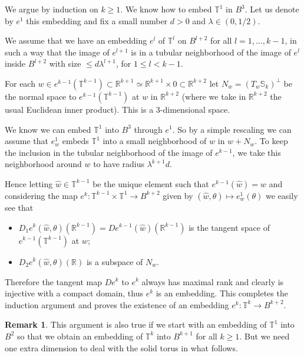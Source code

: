 \documentclass[reqno,12pt,a4paper]{amsart}
\theoremstyle{plain}
\theoremstyle{definition}
\newtheorem{remark}[theorem]{Remark}
\begin{document}
We argue by induction on $k\ge1$. We know how to embed
${{\mathbb T}}^1$ in $B^3$. Let us denote by $e^1$ this embedding
and fix a small number $d>0$ and $\lambda\in(0,1/2)$.

We assume that we have an embedding $e^{l}$ of ${{\mathbb T}}^{l}$ on
$B^{l+2}$ for all $l=1,\dots,k-1$, in such a way that the
image of $e^{l+1}$ is in a tubular neighborhood of the image
of $e^l$ inside $B^{l+2}$ with size $\le d\lambda^{l+1}$, for
$1\le l < k-1$.

For each $w\in e^{k-1}({{\mathbb T}}^{k-1})\subset {{\mathbb R}}^{k+1}\simeq
{{\mathbb R}}^{k+1}\times 0 \subset {{\mathbb R}}^{k+2}$ let
$N_w=(T_w{{\mathbb S}}_{k})^\perp$ be the normal space to
$e^{k-1}({{\mathbb T}}^{k-1})$ at $w$ in ${{\mathbb R}}^{k+2}$ (where we take in
${{\mathbb R}}^{k+2}$ the usual Euclidean inner product). This is a
$3$-dimensional space.

We know we can embed ${{\mathbb T}}^1$ into $B^3$ through
$e^1$. So by a simple rescaling we can assume that $e^1_w$
embeds ${{\mathbb T}}^{1}$ into a small neighborhood of $w$ in
$w+N_w$. To keep the inclusion in the tubular
neighborhood of the image of $e^{k-1}$, we take this
neighborhood around $w$ to have radius $\lambda^{k+1}d$.

Hence letting $\hat w\in{{\mathbb T}}^{k-1}$ be the unique element
such that $e^{k-1}(\hat w)=w$ and considering the map
$e^k:{{\mathbb T}}^{k-1}\times{{\mathbb T}}^1\to B^{k+2}$ given by $(\hat
w,\theta)\mapsto e^1_w(\theta)$ we easily see that
\begin{itemize}
\item $D_1 e^k (\hat w,\theta)  ({{\mathbb R}}^{k-1}) =
  De^{k-1}(\hat w)({{\mathbb R}}^{k-1})$ is the tangent space of
  $e^{k-1}({{\mathbb T}}^{k-1})$ at $w$;
\item $D_2 e^k (\hat w,\theta)  ({{\mathbb R}})$ is a subspace of $N_w$.
\end{itemize}
Therefore the tangent map $De^k$ to $e^k$ always has maximal
rank and clearly is injective with a compact domain, thus
$e^k$ is an embedding.  This completes the induction
argument and proves the existence of an embedding
$e^k:{{\mathbb T}}^k\to B^{k+2}$.

\begin{remark}\label{rmk:embedd-B2}
  This argument is also true if we start with an embedding
  of ${{\mathbb T}}^1$ into $B^2$ so that we obtain an embedding of
  ${{\mathbb T}}^k$ into $B^{k+1}$ for all $k\ge1$. But we need one
  extra dimension to deal with the solid torus in what
  follows.
\end{remark}
\end{document}
